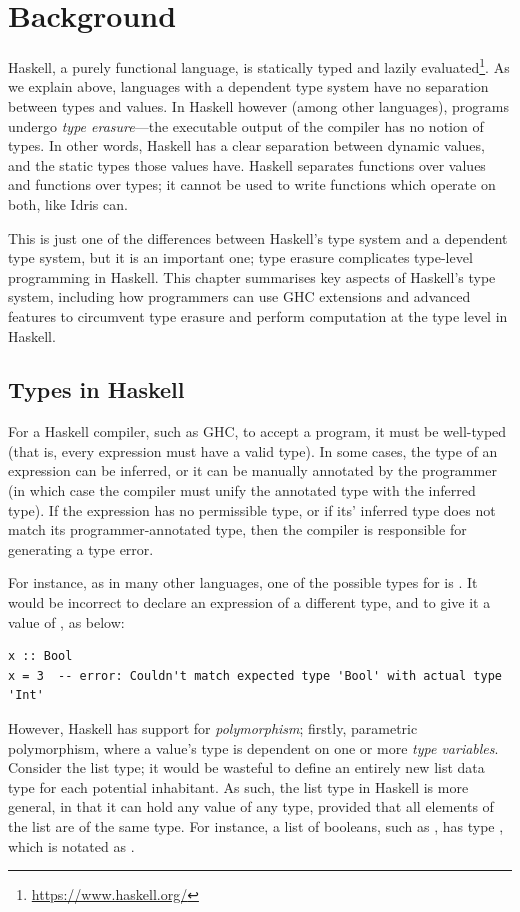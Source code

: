 \chapter{Background}

Haskell, a purely functional language, is statically typed and lazily evaluated\footnote{\url{https://www.haskell.org/}}. As we explain above, languages with a dependent type system have no separation between types and values. In Haskell however (among other languages), programs undergo \emph{type erasure}---the executable output of the compiler has no notion of types. In other words, Haskell has a clear separation between dynamic values, and the static types those values have. Haskell separates functions over values and functions over types; it cannot be used to write functions which operate on both, like Idris can.

This is just one of the differences between Haskell's type system and a dependent type system, but it is an important one; type erasure complicates type-level programming in Haskell. This chapter summarises key aspects of Haskell's type system, including how programmers can use GHC extensions and advanced features to circumvent type erasure and perform computation at the type level in Haskell.

\section{Types in Haskell}

For a Haskell compiler, such as GHC, to accept a program, it must be well-typed (that is, every expression must have a valid type). In some cases, the type of an expression can be inferred, or it can be manually annotated by the programmer (in which case the compiler must unify the annotated type with the inferred type). If the expression has no permissible type, or if its' inferred type does not match its programmer-annotated type, then the compiler is responsible for generating a type error.

For instance, as in many other languages, one of the possible types for  is . It would be incorrect to declare an expression of a different type, and to give it a value of , as below:

\begin{lstlisting}
x :: Bool
x = 3  -- error: Couldn't match expected type 'Bool' with actual type 'Int'
\end{lstlisting}

However, Haskell has support for \emph{polymorphism}; firstly, parametric polymorphism, where a value's type is dependent on one or more \emph{type variables}. Consider the list type; it would be wasteful to define an entirely new list data type for each potential inhabitant. As such, the list type in Haskell is more general, in that it can hold any value of any type, provided that all elements of the list are of the same type. For instance, a list of booleans, such as , has type \inline{[Bool]}, which is notated as .

